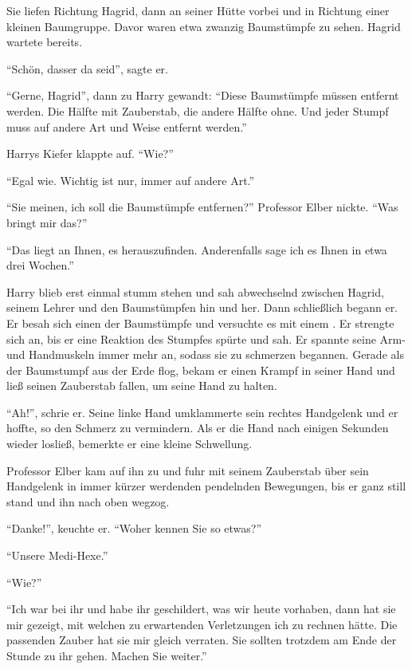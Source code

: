 Sie liefen Richtung Hagrid, dann an seiner Hütte vorbei und in Richtung einer kleinen Baumgruppe. Davor waren etwa zwanzig Baumstümpfe zu sehen. Hagrid wartete bereits.

\enquote{Schön, dasser da seid}, sagte er.

\enquote{Gerne, Hagrid}, dann zu Harry gewandt: \enquote{Diese Baumstümpfe müssen entfernt werden. Die Hälfte mit Zauberstab, die andere Hälfte ohne. Und jeder Stumpf muss auf andere Art und Weise entfernt werden.}

Harrys Kiefer klappte auf. \enquote{Wie?}

\enquote{Egal wie. Wichtig ist nur, immer auf andere Art.}

\enquote{Sie meinen, ich soll die Baumstümpfe entfernen?} Professor Elber nickte. \enquote{Was bringt mir das?}

\enquote{Das liegt an Ihnen, es herauszufinden. Anderenfalls sage ich es Ihnen in etwa drei Wochen.}

Harry blieb erst einmal stumm stehen und sah abwechselnd zwischen Hagrid, seinem Lehrer und den Baumstümpfen hin und her. Dann schließlich begann er. Er besah sich einen der Baumstümpfe und versuchte es mit einem . Er strengte sich an, bis er eine Reaktion des Stumpfes spürte und sah. Er spannte seine Arm- und Handmuskeln immer mehr an, sodass sie zu schmerzen begannen. Gerade als der Baumstumpf aus der Erde flog, bekam er einen Krampf in seiner Hand und ließ seinen Zauberstab fallen, um seine Hand zu halten.

\enquote{Ah!}, schrie er. Seine linke Hand umklammerte sein rechtes Handgelenk und er hoffte, so den Schmerz zu vermindern. Als er die Hand nach einigen Sekunden wieder losließ, bemerkte er eine kleine Schwellung.

Professor Elber kam auf ihn zu und fuhr mit seinem Zauberstab über sein Handgelenk in immer kürzer werdenden pendelnden Bewegungen, bis er ganz still stand und ihn nach oben wegzog.

\enquote{Danke!}, keuchte er. \enquote{Woher kennen Sie so etwas?}

\enquote{Unsere Medi-Hexe.}

\enquote{Wie?}

\enquote{Ich war bei ihr und habe ihr geschildert, was wir heute vorhaben, dann hat sie mir gezeigt, mit welchen zu erwartenden Verletzungen ich zu rechnen hätte. Die passenden Zauber hat sie mir gleich verraten. Sie sollten trotzdem am Ende der Stunde zu ihr gehen. Machen Sie weiter.}

